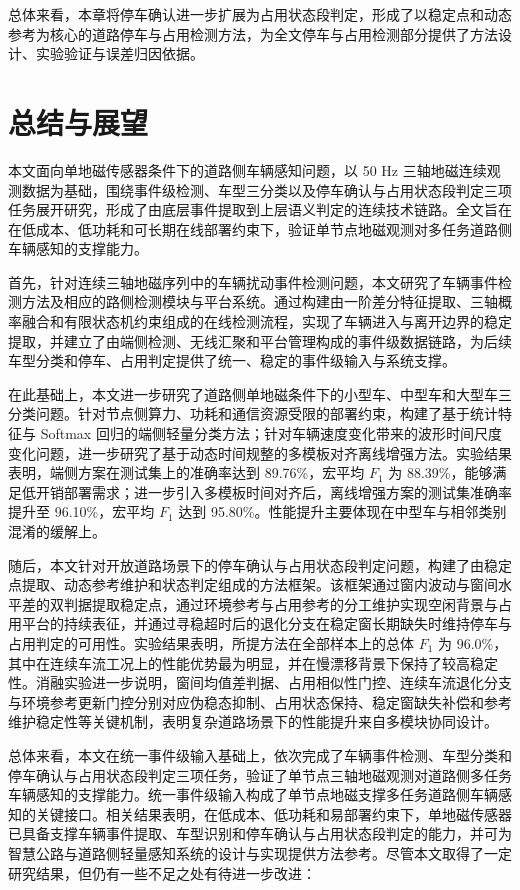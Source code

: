 \documentclass{xdupgthesis}
\begin{document}
总体来看，本章将停车确认进一步扩展为占用状态段判定，形成了以稳定点和动态参考为核心的道路停车与占用检测方法，为全文停车与占用检测部分提供了方法设计、实验验证与误差归因依据。




\chapter{总结与展望}

本文面向单地磁传感器条件下的道路侧车辆感知问题，以 50 Hz 三轴地磁连续观测数据为基础，围绕事件级检测、车型三分类以及停车确认与占用状态段判定三项任务展开研究，形成了由底层事件提取到上层语义判定的连续技术链路。全文旨在在低成本、低功耗和可长期在线部署约束下，验证单节点地磁观测对多任务道路侧车辆感知的支撑能力。

首先，针对连续三轴地磁序列中的车辆扰动事件检测问题，本文研究了车辆事件检测方法及相应的路侧检测模块与平台系统。通过构建由一阶差分特征提取、三轴概率融合和有限状态机约束组成的在线检测流程，实现了车辆进入与离开边界的稳定提取，并建立了由端侧检测、无线汇聚和平台管理构成的事件级数据链路，为后续车型分类和停车、占用判定提供了统一、稳定的事件级输入与系统支撑。

在此基础上，本文进一步研究了道路侧单地磁条件下的小型车、中型车和大型车三分类问题。针对节点侧算力、功耗和通信资源受限的部署约束，构建了基于统计特征与 Softmax 回归的端侧轻量分类方法；针对车辆速度变化带来的波形时间尺度变化问题，进一步研究了基于动态时间规整的多模板对齐离线增强方法。实验结果表明，端侧方案在测试集上的准确率达到 89.76\%，宏平均 $F_1$ 为 88.39\%，能够满足低开销部署需求；进一步引入多模板时间对齐后，离线增强方案的测试集准确率提升至 96.10\%，宏平均 $F_1$ 达到 95.80\%。性能提升主要体现在中型车与相邻类别混淆的缓解上。

随后，本文针对开放道路场景下的停车确认与占用状态段判定问题，构建了由稳定点提取、动态参考维护和状态判定组成的方法框架。该框架通过窗内波动与窗间水平差的双判据提取稳定点，通过环境参考与占用参考的分工维护实现空闲背景与占用平台的持续表征，并通过寻稳超时后的退化分支在稳定窗长期缺失时维持停车与占用判定的可用性。实验结果表明，所提方法在全部样本上的总体 $F_1$ 为 96.0\%，其中在连续车流工况上的性能优势最为明显，并在慢漂移背景下保持了较高稳定性。消融实验进一步说明，窗间均值差判据、占用相似性门控、连续车流退化分支与环境参考更新门控分别对应伪稳态抑制、占用状态保持、稳定窗缺失补偿和参考维护稳定性等关键机制，表明复杂道路场景下的性能提升来自多模块协同设计。

总体来看，本文在统一事件级输入基础上，依次完成了车辆事件检测、车型分类和停车确认与占用状态段判定三项任务，验证了单节点三轴地磁观测对道路侧多任务车辆感知的支撑能力。统一事件级输入构成了单节点地磁支撑多任务道路侧车辆感知的关键接口。相关结果表明，在低成本、低功耗和易部署约束下，单地磁传感器已具备支撑车辆事件提取、车型识别和停车确认与占用状态段判定的能力，并可为智慧公路与道路侧轻量感知系统的设计与实现提供方法参考。尽管本文取得了一定研究结果，但仍有一些不足之处有待进一步改进：
\end{document}
